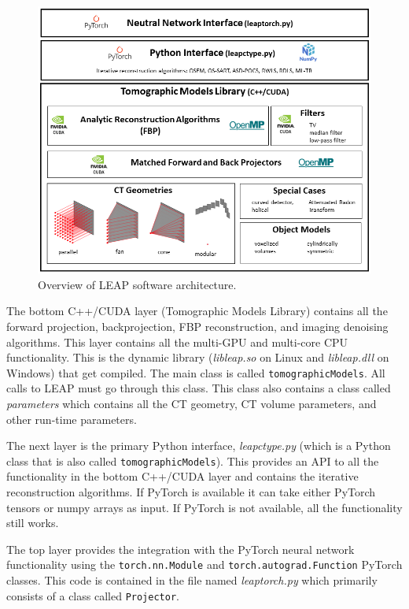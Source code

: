 \documentclass[11pt]{article}
\begin{document}
\begin{figure}[h!]
\begin{center}
\includegraphics[scale=0.65]{LEAPoverview.png}
\end{center}
\vspace{-10pt}\caption{Overview of LEAP software architecture.} \label{fig:LEAParchitecture}
\end{figure}

The bottom C++/CUDA layer (Tomographic Models Library) contains all the forward projection, backprojection, FBP reconstruction, and imaging denoising algorithms.  This layer contains all the multi-GPU and multi-core CPU functionality.  This is the dynamic library (\textit{libleap.so} on Linux and \textit{libleap.dll} on Windows) that get compiled.  The main class is called \texttt{tomographicModels}.  All calls to LEAP must go through this class.  This class also contains a class called \textit{parameters} which contains all the CT geometry, CT volume parameters, and other run-time parameters.

The next layer is the primary Python interface, \textit{leapctype.py} (which is a Python class that is also called \texttt{tomographicModels}).  This provides an API to all the functionality in the bottom C++/CUDA layer and contains the iterative reconstruction algorithms.  If PyTorch is available it can take either PyTorch tensors or numpy arrays as input.  If PyTorch is not available, all the functionality still works.

The top layer provides the integration with the PyTorch neural network functionality using the \texttt{torch.nn.Module} and \texttt{torch.autograd.Function} PyTorch classes.  This code is contained in the file named \textit{leaptorch.py} which primarily consists of a class called \texttt{Projector}.  
\end{document}
